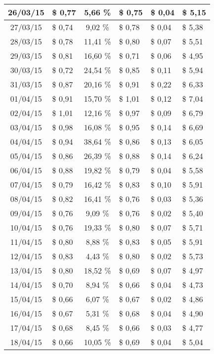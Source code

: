 \begin{center}
\begin{small}
\begin{longtable}{|c|l|c|l|l|l|}
26/03/15 & \$ 0,77 & 5,66 \% & \$ 0,75 & \$ 0,04 & \$ 5,15 \\ \hline
27/03/15 & \$ 0,74 & 9,02 \% & \$ 0,78 & \$ 0,04 & \$ 5,38 \\ \hline
28/03/15 & \$ 0,78 & 11,41 \% & \$ 0,80 & \$ 0,07 & \$ 5,51 \\ \hline
29/03/15 & \$ 0,81 & 16,60 \% & \$ 0,71 & \$ 0,06 & \$ 4,95 \\ \hline
30/03/15 & \$ 0,72 & 24,54 \% & \$ 0,85 & \$ 0,11 & \$ 5,94 \\ \hline
31/03/15 & \$ 0,87 & 20,16 \% & \$ 0,91 & \$ 0,22 & \$ 6,33 \\ \hline
01/04/15 & \$ 0,91 & 15,70 \% & \$ 1,01 & \$ 0,12 & \$ 7,04 \\ \hline
02/04/15 & \$ 1,01 & 12,16 \% & \$ 0,97 & \$ 0,09 & \$ 6,79 \\ \hline
03/04/15 & \$ 0,98 & 16,08 \% & \$ 0,95 & \$ 0,14 & \$ 6,69 \\ \hline
04/04/15 & \$ 0,94 & 38,64 \% & \$ 0,86 & \$ 0,13 & \$ 6,05 \\ \hline
05/04/15 & \$ 0,86 & 26,39 \% & \$ 0,88 & \$ 0,14 & \$ 6,24 \\ \hline
06/04/15 & \$ 0,88 & 19,82 \% & \$ 0,79 & \$ 0,04 & \$ 5,58 \\ \hline
07/04/15 & \$ 0,79 & 16,42 \% & \$ 0,83 & \$ 0,10 & \$ 5,91 \\ \hline
08/04/15 & \$ 0,82 & 16,41 \% & \$ 0,76 & \$ 0,03 & \$ 5,36 \\ \hline
09/04/15 & \$ 0,76 & 9,09 \% & \$ 0,76 & \$ 0,02 & \$ 5,40 \\ \hline
10/04/15 & \$ 0,76 & 19,33 \% & \$ 0,80 & \$ 0,07 & \$ 5,71 \\ \hline
11/04/15 & \$ 0,80 & 8,88 \% & \$ 0,83 & \$ 0,05 & \$ 5,91 \\ \hline
12/04/15 & \$ 0,83 & 4,43 \% & \$ 0,80 & \$ 0,02 & \$ 5,73 \\ \hline
13/04/15 & \$ 0,80 & 18,52 \% & \$ 0,69 & \$ 0,07 & \$ 4,97 \\ \hline
14/04/15 & \$ 0,70 & 8,94 \% & \$ 0,66 & \$ 0,04 & \$ 4,73 \\ \hline
15/04/15 & \$ 0,66 & 6,07 \% & \$ 0,67 & \$ 0,02 & \$ 4,86 \\ \hline
16/04/15 & \$ 0,67 & 5,31 \% & \$ 0,68 & \$ 0,04 & \$ 4,90 \\ \hline
17/04/15 & \$ 0,68 & 8,45 \% & \$ 0,66 & \$ 0,03 & \$ 4,77 \\ \hline
18/04/15 & \$ 0,66 & 10,05 \% & \$ 0,69 & \$ 0,04 & \$ 5,04 \\ \hline

\end{longtable}
\end{small}
\end{center}
